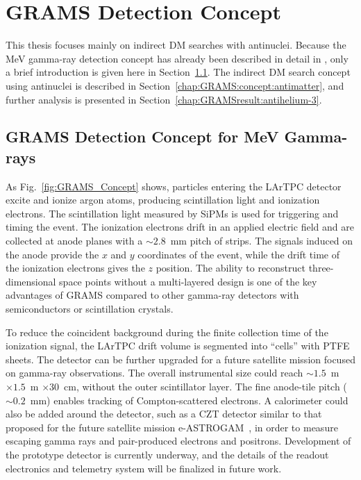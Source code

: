 \section{GRAMS Detection Concept}
\label{chap:GRAMS:concept}
This thesis focuses mainly on indirect \ac{DM} searches with antinuclei. Because the MeV gamma-ray detection concept has already been described in detail in \cite{aramaki2020dual}, only a brief introduction is given here in Section~\ref{chap:GRAMS:concept:gamma}. The indirect \ac{DM} search concept using antinuclei is described in Section~\ref{chap:GRAMS:concept:antimatter}, and further analysis is presented in Section~\ref{chap:GRAMSresult:antihelium-3}.

\subsection{GRAMS Detection Concept for MeV Gamma-rays}
\label{chap:GRAMS:concept:gamma}

As Fig.~\ref{fig:GRAMS_Concept} shows, particles entering the LArTPC detector excite and ionize argon atoms, producing scintillation light and ionization electrons. The scintillation light measured by \ac{SiPM}s is used for triggering and timing the event. The ionization electrons drift in an applied electric field and are collected at anode planes with a $\sim 2.8$~mm pitch of strips. The signals induced on the anode provide the $x$ and $y$ coordinates of the event, while the drift time of the ionization electrons gives the $z$ position. The ability to reconstruct three-dimensional space points without a multi-layered design is one of the key advantages of GRAMS compared to other gamma-ray detectors with semiconductors or scintillation crystals.

To reduce the coincident background during the finite collection time of the ionization signal, the LArTPC drift volume is segmented into ``cells'' with PTFE sheets. The detector can be further upgraded for a future satellite mission focused on gamma-ray observations. The overall instrumental size could reach $\sim 1.5$~m $\times 1.5$~m $\times 30$~cm, without the outer scintillator layer. The fine anode-tile pitch ($\sim 0.2$~mm) enables tracking of Compton-scattered electrons. A calorimeter could also be added around the detector, such as a \ac{CZT} detector similar to that proposed for the future satellite mission e-ASTROGAM~\cite{10.1007/s10686-017-9533-6}, in order to measure escaping gamma rays and pair-produced electrons and positrons. Development of the prototype detector is currently underway, and the details of the readout electronics and telemetry system will be finalized in future work.

